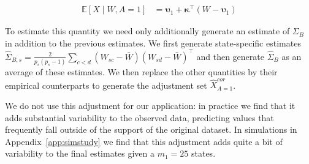 \begin{align}\label{eqn:xcoradjust}
    \mathbb{E}[X \mid W, A = 1] &=  \boldsymbol{\upsilon}_1 + \boldsymbol{\kappa}^\top(W - \boldsymbol{\upsilon}_1)  
\end{align}

To estimate this quantity we need only additionally generate an estimate of $\Sigma_B$ in addition to the previous estimates. We first generate state-specific estimates $\hat{\Sigma}_{B, s}= \frac{2}{p_s(p_s - 1)}\sum_{c < d}(W_{sc} - \bar{W})(W_{sd} - \bar{W})^\top$ and then generate $\hat{\Sigma}_B$ as an average of these estimates. We then replace the other quantities by their empirical counterparts to generate the adjustment set $\hat{X}_{A=1}^{cor}$.

We do not use this adjustment for our application: in practice we find that it adds substantial variability to the observed data, predicting values that frequently fall outside of the support of the original dataset. In simulations in Appendix~\ref{app:simstudy} we find that this adjustment adds quite a bit of variability to the final estimates given a $m_1 = 25$ states. 